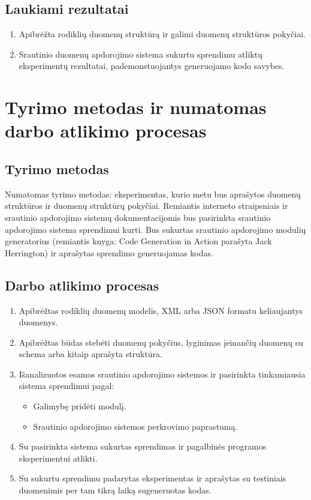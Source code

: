 \documentclass{VUMIFPSbakalaurinis}
\begin{document}
\subsection{Laukiami rezultatai}
\begin{enumerate}
    \item Apibrėžta rodiklių duomenų struktūrą ir galimi duomenų struktūros pokyčiai.
    \item Srautinio duomenų apdorojimo sistema sukurtu sprendimu atliktų eksperimentų rezultatai, pademonstuojantys generuojamo kodo savybes. 
    
\end{enumerate}
\section{Tyrimo metodas ir numatomas darbo atlikimo procesas}

\subsection{Tyrimo metodas}
Numatomas tyrimo metodas: eksperimentas, kurio metu bus aprašytos duomenų struktūros ir duomenų struktūrų pokyčiai. Remiantis interneto straipsniais ir srautinio apdorojimo sistemų dokumentacijomis bus pasirinkta srautinio apdorojimo sistema sprendimui kurti. Bus sukurtas srautinio apdorojimo modulių generatorius (remiantis knyga: Code Generation in Action parašyta Jack Herrington) ir aprašytas sprendimo generuojamas kodas. \par 

\subsection{Darbo atlikimo procesas}
\begin{enumerate}
    \item Apibrėžtas rodiklių duomenų modelis, XML arba JSON formatu keliaujantys duomenys.
    \item Apibrėžtas būdas stebėti duomenų pokyčius, lyginimas įeinančių duomenų su schema arba kitaip aprašyta struktūra.
    \item Išanalizuotos esamos srautinio apdorojimo sistemos ir pasirinkta tinkamiausia sistema sprendimui pagal:
    	\begin{itemize}
		\item Galimybę pridėti modulį.
		\item Srautinio apdorojimo sistemos perkrovimo paprastumą.
	\end{itemize}
    \item Su pasirinkta sistema sukurtas sprendimas ir pagalbinės programos eksperimentui atlikti.
    \item Su sukurtu sprendimu padarytas eksperimentas ir aprašytas su testiniais duomenimis per tam tikrą laiką sugeneruotas kodas. 
\end{enumerate}
\end{document}
